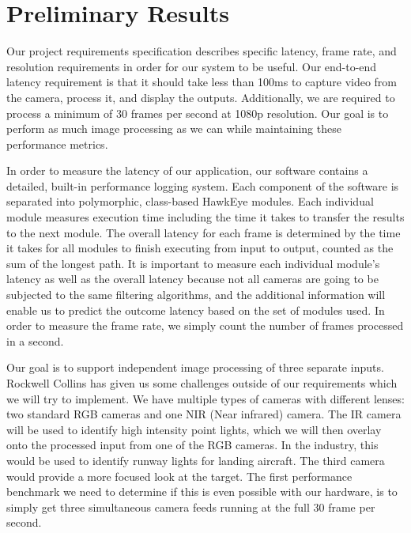 \documentclass[letterpaper,10pt,titlepage]{IEEEtran}
\begin{document}
   \section{Preliminary Results}
   Our project requirements specification describes specific latency, frame rate, and resolution requirements in order for our system to be useful. Our end-to-end latency requirement is that it should take less than 100ms to capture video from the camera, process it, and display the outputs. Additionally, we are required to process a minimum of 30 frames per second at 1080p resolution. Our goal is to perform as much image processing as we can while maintaining these performance metrics.\\
\par
In order to measure the latency of our application, our software contains a detailed, built-in performance logging system. Each component of the software is separated into polymorphic, class-based HawkEye modules. Each individual module measures execution time including the time it takes to transfer the results to the next module. The overall latency for each frame is determined by the time it takes for all modules to finish executing from input to output, counted as the sum of the longest path. It is important to measure each individual module's latency as well as the overall latency because not all cameras are going to be subjected to the same filtering algorithms, and the additional information will enable us to predict the outcome latency based on the set of modules used. In order to measure the frame rate, we simply count the number of frames processed in a second.\\
\par
Our goal is to support independent image processing of three separate inputs. Rockwell Collins has given us some challenges outside of our requirements which we will try to implement. We have multiple types of cameras with different lenses: two standard RGB cameras and one NIR (Near infrared) camera. The IR camera will be used to identify high intensity point lights, which we will then overlay onto the processed input from one of the RGB cameras. In the industry, this would be used to identify runway lights for landing aircraft. The third camera would provide a more focused look at the target. The first performance benchmark we need to determine if this is even possible with our hardware, is to simply get three simultaneous camera feeds running at the full 30 frame per second.\\
\end{document}
